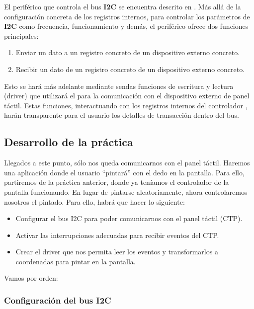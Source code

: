 \documentclass[../main.tex]{subfiles}
\begin{document}
            El periférico que controla el bus \textbf{I2C} se encuentra descrito en \REFMAN[26]. Más allá de la configuración concreta de los registros internos, para controlar los parámetros de \textbf{I2C} como frecuencia, funcionamiento y demás, el periférico ofrece dos funciones principales:

            \begin{enumerate}
                \item Enviar un dato a un registro concreto de un dispositivo externo concreto.
                \item Recibir un dato de un registro concreto de un dispositivo externo concreto.
            \end{enumerate}

            Esto se hará más adelante mediante sendas funciones de escritura y lectura (driver) que utilizará el  para la comunicación con el dispositivo externo de panel táctil. Estas funciones, interactuando con los registros internos del controlador , harán transparente para el usuario los detalles de transacción dentro del bus.

    \subsection{Desarrollo de la práctica}

        Llegados a este punto, sólo nos queda comunicarnos con el panel táctil. Haremos una aplicación donde el usuario ``pintará'' con el dedo en la pantalla. Para ello, partiremos de la práctica anterior, donde ya teníamos el controlador de la pantalla funcionando. En lugar de pintarse aleatoriamente, ahora controlaremos nosotros el pintado. Para ello, habrá que hacer lo siguiente:

        \begin{itemize}
            \item Configurar el bus I2C para poder comunicarnos con el panel táctil (CTP).
            \item Activar las interrupciones adecuadas para recibir eventos del CTP.
            \item Crear el driver que nos permita leer los eventos y transformarlos a coordenadas para pintar en la pantalla.
        \end{itemize}

        Vamos por orden:

        \subsubsection{Configuración del bus I2C}
            
\end{document}
